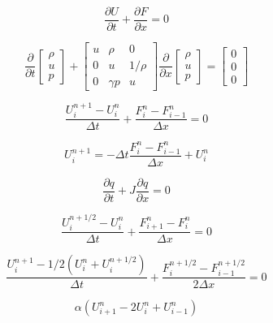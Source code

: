 
$$
\frac{\partial U}{\partial t}+\frac{\partial F}{\partial x}=0
$$

$$
\frac{\partial}{\partial t}\begin{bmatrix}
    \rho \\ u \\ p
\end{bmatrix} + \begin{bmatrix}
    u & \rho & 0 \\ 0 & u & 1/\rho \\ 0 & \gamma p & u
\end{bmatrix}\frac{\partial}{\partial x}\begin{bmatrix}
    \rho \\ u \\ p
\end{bmatrix} = \begin{bmatrix}
    0 \\ 0 \\ 0
\end{bmatrix}
$$

$$
\frac{U_i^{n+1}-U_i^n}{\Delta t}+\frac{F_i^n-F_{i-1}^n}{\Delta x}=0
$$

$$
U_i^{n+1}=-\Delta t\frac{F_i^n-F_{i-1}^n}{\Delta x}+U_i^n
$$

$$
\frac{\partial q}{\partial t}+J\frac{\partial q}{\partial x}=0
$$

$$
\frac{U_i^{n+1/2}-U_i^n}{\Delta t}+\frac{F_{i+1}^n-F_i^n}{\Delta x}=0
$$

$$
\frac{U_i^{n+1}-1/2\left(U_i^n+U_i^{n+1/2}\right)}{\Delta t}+\frac{F_i^{n+1/2}-F_{i-1}^{n+1/2}}{2\Delta x}=0
$$

$$
\alpha\left(U_{i+1}^n-2U_i^n+U_{i-1}^n\right)
$$